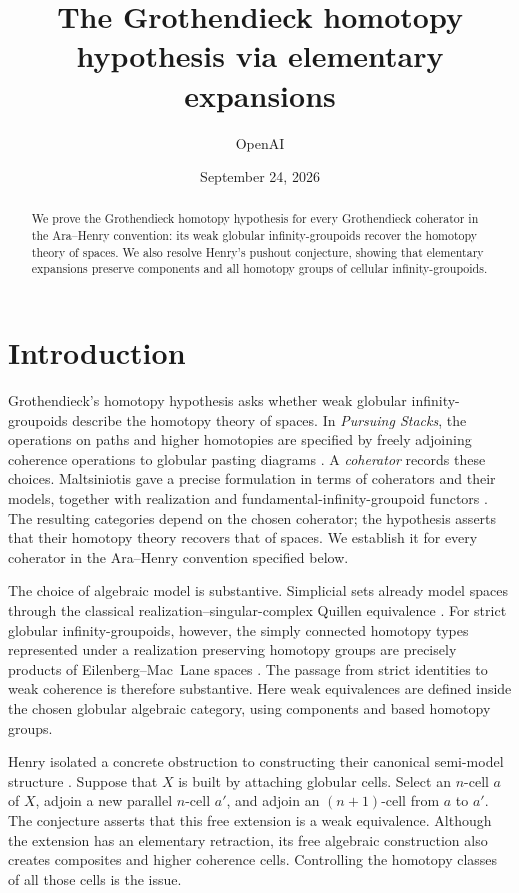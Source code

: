 \documentclass[11pt,letterpaper]{article}
\title{The Grothendieck homotopy hypothesis via elementary expansions}
\author{OpenAI}
\date{September 24, 2026}
\numberwithin{equation}{section}
\theoremstyle{plain}
\theoremstyle{definition}
\theoremstyle{remark}
\begin{document}
\begin{abstract}
We prove the Grothendieck homotopy hypothesis for every Grothendieck
coherator in the Ara--Henry convention: its weak globular infinity-groupoids
recover the homotopy theory of spaces.
We also resolve Henry's pushout conjecture, showing that elementary expansions
preserve components and all homotopy groups of cellular infinity-groupoids.
\end{abstract}
\section{Introduction}\label{sec:introduction}

Grothendieck's homotopy hypothesis asks whether weak globular
infinity-groupoids describe the homotopy theory of spaces.  In
\emph{Pursuing Stacks}, the operations on paths and higher homotopies
are specified by freely adjoining coherence operations to globular
pasting diagrams \cite[Sections~9 and~12--13]{Grothendieck1983}.
A \emph{coherator} records these choices.  Maltsiniotis gave a precise
formulation in terms of coherators and their models, together with
realization and fundamental-infinity-groupoid functors
\cite{Maltsiniotis2007,Maltsiniotis2010}.
The resulting categories depend on the chosen coherator; the hypothesis
asserts that their homotopy theory recovers that of spaces.
We establish it for every coherator in the Ara--Henry convention
specified below.

The choice of algebraic model is substantive.  Simplicial sets already
model spaces through the classical realization--singular-complex
Quillen equivalence \cite[Theorem~3.6.7]{Hovey1999}.
For strict globular infinity-groupoids, however, the simply connected
homotopy types represented under a realization preserving homotopy
groups are precisely products of Eilenberg--Mac~Lane spaces \cite[Theorem~5.4]{AraStrict2013}.
The passage from strict identities to weak coherence is therefore
substantive.  Here weak equivalences are defined
inside the chosen globular algebraic category, using components and
based homotopy groups.

Henry isolated a concrete obstruction to constructing their canonical
semi-model structure \cite[Conjecture~5.3.3]{Henry2016}.  Suppose that \(X\)
is built by attaching globular cells.  Select an \(n\)-cell \(a\) of \(X\),
adjoin a new parallel \(n\)-cell \(a'\), and adjoin an \((n+1)\)-cell from
\(a\) to \(a'\).  The conjecture asserts that this free extension is a weak
equivalence.  Although the extension has an elementary retraction, its
free algebraic construction also creates composites and higher coherence
cells.  Controlling the homotopy classes of all those cells is the issue.
\end{document}
